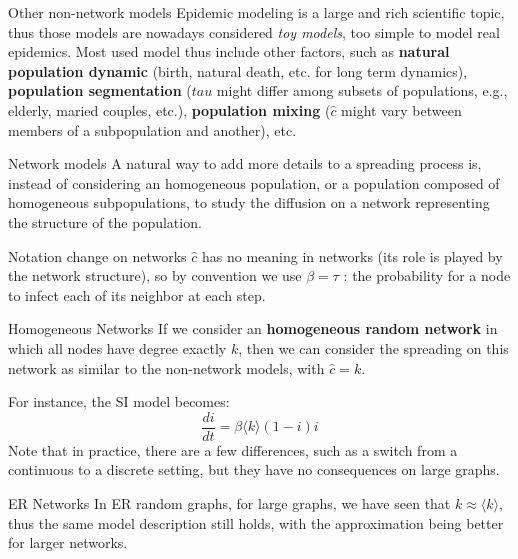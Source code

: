 

\begin{textbox}{Other non-network models}
    Epidemic modeling is a large and rich scientific topic, thus those models are nowadays considered \textit{toy models}, too simple to model real epidemics. Most used model thus include other factors, such as \textbf{natural population dynamic} (birth, natural death, etc. for long term dynamics), \textbf{population segmentation} ($tau$ might differ among subsets of populations, e.g., elderly, maried couples, etc.), \textbf{population mixing} ($\hat{c}$ might vary between members of a subpopulation and another), etc.
\end{textbox}


\begin{textbox}{Network models}
    A natural way to add more details to a spreading process is, instead of considering an homogeneous population, or a population composed of homogeneous subpopulations, to study the diffusion on a network representing the structure of the population.
\end{textbox}


\begin{textbox}{Notation change on networks}
    $\hat{c}$ has no meaning in networks (its role is played by the network structure), so by convention we use $\beta=\tau$ : the probability for a node to infect each of its neighbor at each step.
\end{textbox}


\begin{textbox}{Homogeneous Networks}
    If we consider an \textbf{homogeneous random network} in which all nodes have degree exactly $k$, then we can consider the spreading on this network as similar to the non-network models, with $\hat{c}=k$.

    For instance, the SI model becomes:
    \[
        \frac{di}{dt}=\beta \langle k \rangle (1-i)i
    \]
    Note that in practice, there are a few differences, such as a switch from a continuous to a discrete setting, but they have no consequences on large graphs.
\end{textbox}


\begin{textbox}{ER Networks}
    In ER random graphs, for large graphs, we have seen that $k\approx \langle k \rangle$, thus the same model description still holds, with the approximation being better for larger networks.
\end{textbox}


